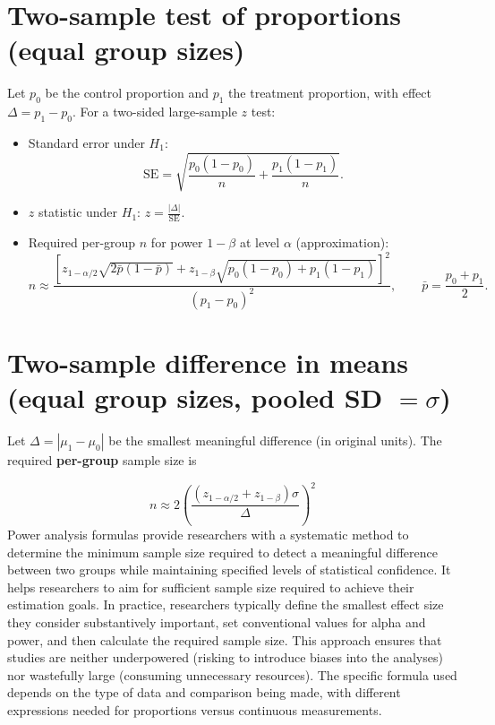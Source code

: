 \documentclass[
  letterpaper,
  DIV=11,
  numbers=noendperiod]{scrreprt}
\begin{document}
\section{Two-sample test of proportions (equal group
sizes)}\label{two-sample-test-of-proportions-equal-group-sizes}

Let \(p_0\) be the control proportion and \(p_1\) the treatment
proportion, with effect \(\Delta = p_1 - p_0\). For a two-sided
large-sample \(z\) test:

\begin{itemize}
\item
  Standard error under \(H_1\): \[
  \mathrm{SE} = \sqrt{\frac{p_0(1 - p_0)}{n} + \frac{p_1(1 - p_1)}{n}}.
  \]
\item
  \(z\) statistic under \(H_1\): \(z = \frac{|\Delta|}{\mathrm{SE}}\).
\item
  Required per-group \(n\) for power \(1-\beta\) at level \(\alpha\)
  (approximation): \[
  n \approx \frac{\left[z_{1-\alpha/2}\sqrt{2\bar{p}(1-\bar{p})} + z_{1-\beta}\sqrt{p_0(1-p_0) + p_1(1-p_1)}\right]^2}{(p_1 - p_0)^2}, \qquad \bar{p}=\frac{p_0+p_1}{2}.
  \]
\end{itemize}

\section{\texorpdfstring{Two-sample difference in means (equal group
sizes, pooled SD
\(=\sigma\))}{Two-sample difference in means (equal group sizes, pooled SD =\textbackslash sigma)}}\label{two-sample-difference-in-means-equal-group-sizes-pooled-sd-sigma}

Let \(\Delta = |\mu_1 - \mu_0|\) be the smallest meaningful difference
(in original units). The required \textbf{per-group} sample size is

\[
n \approx 2\left(\frac{(z_{1-\alpha/2} + z_{1-\beta})\sigma}{\Delta}\right)^2
\] Power analysis formulas provide researchers with a systematic method
to determine the minimum sample size required to detect a meaningful
difference between two groups while maintaining specified levels of
statistical confidence. It helps researchers to aim for sufficient
sample size required to achieve their estimation goals. In practice,
researchers typically define the smallest effect size they consider
substantively important, set conventional values for alpha and power,
and then calculate the required sample size. This approach ensures that
studies are neither underpowered (risking to introduce biases into the
analyses) nor wastefully large (consuming unnecessary resources). The
specific formula used depends on the type of data and comparison being
made, with different expressions needed for proportions versus
continuous measurements.
\end{document}
